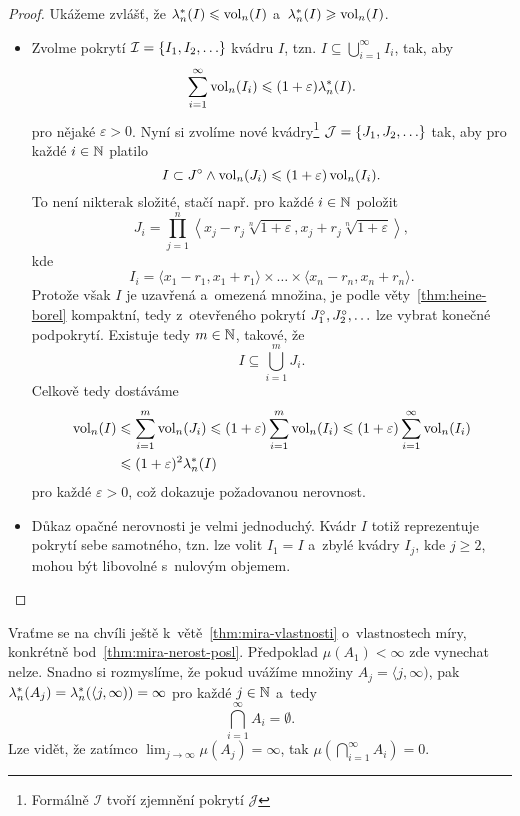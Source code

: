 \begin{proof}
    Ukážeme zvlášť, že $\lambda_n^*(I)\leqslant\operatorname{vol}_n(I)$ a~$\lambda_n^*(I)\geqslant\operatorname{vol}_n(I)$.
    \begin{itemize}
        \item Zvolme pokrytí $\mathcal{I}=\left\{I_1,I_2,\ldots\right\}$ kvádru $I$, tzn. $I\subseteq\bigcup_{i=1}^\infty I_i$, tak, aby
        \[\sum_{i=1}^{\infty}\operatorname{vol}_n(I_i)\leqslant(1+\varepsilon)\lambda_n^*(I).\]
        pro nějaké $\varepsilon>0$. Nyní si zvolíme nové kvádry\footnote{Formálně $\mathcal{I}$ tvoří zjemnění pokrytí $\mathcal{J}$} $\mathcal{J}=\left\{J_1,J_2,\ldots\right\}$ tak, aby pro každé $i\in\mathbb{N}$ platilo
        \[I\subset J^\circ\land\operatorname{vol}_n(J_i)\leqslant(1+\varepsilon)\operatorname{vol}_n(I_i).\]
        To není nikterak složité, stačí např. pro každé $i\in\mathbb{N}$ položit
        \[J_i=\prod_{j=1}^{n}\left\langle x_j-r_j\sqrt[n]{1+\varepsilon},x_j+r_j\sqrt[n]{1+\varepsilon}\right\rangle,\]
        kde
        \[I_i=\langle x_1-r_1,x_1+r_1\rangle\times\ldots\times\langle x_n-r_n,x_n+r_n\rangle.\]
        Protože však $I$ je uzavřená a~omezená množina, je podle věty~\ref{thm:heine-borel} kompaktní, tedy z~otevřeného pokrytí $J_1^\circ,J_2^\circ,\ldots$ lze vybrat konečné podpokrytí. Existuje tedy $m\in\mathbb{N}$, takové, že
        \[I\subseteq\bigcup_{i=1}^m J_i.\]
        Celkově tedy dostáváme
        \begin{align*}
            \operatorname{vol}_n(I)&\leqslant\sum_{i=1}^{m}\operatorname{vol}_n(J_i)\leqslant(1+\varepsilon)\sum_{i=1}^{m}\operatorname{vol}_n(I_i)\leqslant(1+\varepsilon)\sum_{i=1}^{\infty}\operatorname{vol}_n(I_i)\\
            &\leqslant (1+\varepsilon)^2\lambda_n^*(I)
        \end{align*}
        pro každé $\varepsilon>0$, což dokazuje požadovanou nerovnost.
        \item Důkaz opačné nerovnosti je velmi jednoduchý. Kvádr $I$ totiž reprezentuje pokrytí sebe samotného, tzn. lze volit $I_1=I$ a~zbylé kvádry $I_j$, kde $j\geqslant 2$, mohou být libovolné s~nulovým objemem.
    \end{itemize}
\end{proof}
\begin{remark}
    Vraťme se na chvíli ještě k~větě~\ref{thm:mira-vlastnosti} o~vlastnostech míry, konkrétně bod~\ref{thm:mira-nerost-posl}. Předpoklad $\mu(A_1)<\infty$ zde vynechat nelze. Snadno si rozmyslíme, že pokud uvážíme množiny $A_j=\langle j,\infty)$, pak $\lambda_n^*(A_j)=\lambda_n^*(\langle j,\infty))=\infty$ pro každé $j\in\mathbb{N}$ a~tedy
    \[\bigcap_{i=1}^\infty A_i=\emptyset.\]
    Lze vidět, že zatímco $\lim_{j\to\infty}\mu(A_j)=\infty$, tak $\mu\left(\bigcap_{i=1}^\infty A_i\right)=0$.
\end{remark}

